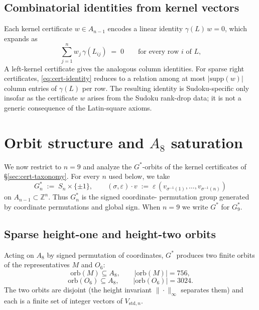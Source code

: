\documentclass[11pt,a4paper]{article}
\theoremstyle{definition}
\theoremstyle{remark}
\providecommand{\Z}{\mathbb{Z}}
\newcommand{\Vstdn}{V_{\mathrm{std},n}}
\begin{document}
\subsection{Combinatorial identities from kernel vectors}
\label{sec:cert-identities}

Each kernel certificate $w \in A_{n-1}$ encodes a linear identity
$\gamma(L)\, w = 0$, which expands as
\begin{equation}\label{eq:cert-identity}
   \sum_{j=1}^{n} w_j \, \gamma(L_{ij}) \;=\; 0
   \qquad \text{for every row $i$ of $L$,}
\end{equation}
A left-kernel certificate gives the analogous column identities. For
sparse right certificates, \eqref{eq:cert-identity} reduces to a
relation among at most $|\mathrm{supp}(w)|$ column entries of
$\gamma(L)$ per row. The resulting identity is Sudoku-specific only
insofar as the certificate $w$ arises from the Sudoku rank-drop data;
it is not a generic consequence of the Latin-square axioms.

\section{\texorpdfstring{Orbit structure and $A_8$ saturation}{Orbit structure and A8 saturation}}\label{sec:orbits}

We now restrict to $n = 9$ and analyze the $G^*$-orbits of the kernel
certificates of \S\ref{sec:cert-taxonomy}. For every $n$ used below,
we take
\begin{equation*}
   G^*_n \;:=\; S_n \times \{\pm 1\},
   \qquad
   (\sigma,\varepsilon)\cdot v
   \;:=\; \varepsilon\,(v_{\sigma^{-1}(1)},\ldots,v_{\sigma^{-1}(n)})
\end{equation*}
on $A_{n-1}\subset \Z^n$. Thus $G^*_n$ is the signed coordinate-
permutation group generated by coordinate permutations and global
sign. When $n=9$ we write $G^*$ for $G^*_9$.

\subsection{Sparse height-one and height-two orbits}\label{sec:orbit-classes}

Acting on $A_8$ by signed permutation of coordinates, $G^*$ produces
two finite orbits of the representatives $M$ and $O_6$:
\begin{equation*}
   \mathrm{orb}(M) \subseteq A_8,
   \qquad |\mathrm{orb}(M)| = 756,
\end{equation*}
\begin{equation*}
   \mathrm{orb}(O_6) \subseteq A_8,
   \qquad |\mathrm{orb}(O_6)| = 3024.
\end{equation*}
The two orbits are disjoint (the height invariant
$\|\cdot\|_\infty$ separates them) and each is a finite set of
integer vectors of $\Vstdn$.
\end{document}
